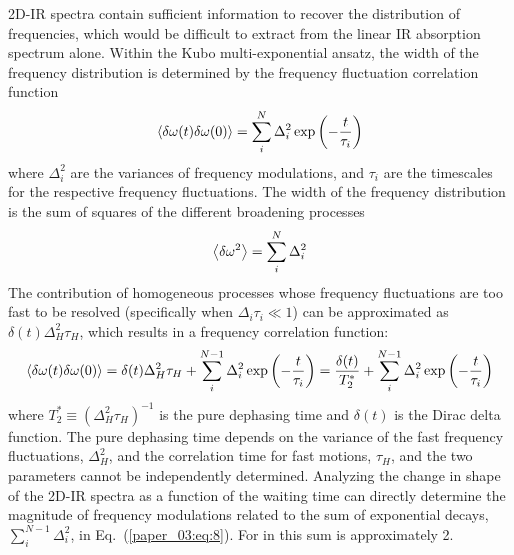 \documentclass[%
  class = book,%
  crop = false,%
  float = true,%
  multi = true,%
  preview = false,%
]{standalone}
\let\cite\autocite
\begin{document}
2D-IR spectra contain sufficient information to recover the distribution of frequencies, which would be difficult to extract from the linear IR absorption spectrum alone.\cite{Brinzer2015} Within the Kubo multi-exponential ansatz, the width of the frequency distribution is determined by the frequency fluctuation correlation function
\begin{equation}
  \label{paper_03:eq:6}
  \Braket{\delta\omega(t)\delta\omega(0)} = \sum_{i}^{N} \Delta_{i}^{2}\exp\left( - \frac{t}{\tau_{i}} \right)
\end{equation}
where \(\Delta_{i}^{2}\) are the variances of frequency modulations, and \(\tau_{i}\) are the timescales for the respective frequency fluctuations. The width of the frequency distribution is the sum of squares of the different broadening processes
\begin{equation}
  \label{paper_03:eq:7}
  \Braket{\delta\omega^{2}} = \sum_{i}^{N} \Delta_{i}^{2}
\end{equation}
The contribution of homogeneous processes whose frequency fluctuations are too fast to be resolved (specifically when \(\Delta_{i}\tau_{i} \ll 1\)) can be approximated as \(\delta(t)\Delta_{H}^{2}\tau_{H}\), which results in a frequency correlation function:
\begin{equation}
  \label{paper_03:eq:8}
  \Braket{\delta\omega(t)\delta\omega(0)} = \delta(t)\Delta_{H}^{2}\tau_{H} + \sum_{i}^{N - 1}{\Delta_{i}^{2}\exp\left( - \frac{t}{\tau_{i}} \right)} = \frac{\delta(t)}{T_{2}^{*}} + \sum_{i}^{N - 1}{\Delta_{i}^{2}\exp\left( - \frac{t}{\tau_{i}} \right)}
\end{equation}
where \(T_{2}^{*} \equiv \left( \Delta_{H}^{2}\tau_{H} \right)^{- 1}\) is the pure dephasing time and \(\delta(t)\) is the Dirac delta function. The pure dephasing time depends on the variance of the fast frequency fluctuations, \(\Delta_{H}^{2}\), and the correlation time for fast motions, \(\tau_{H}\), and the two parameters cannot be independently determined. Analyzing the change in shape of the 2D-IR spectra as a function of the waiting time can directly determine the magnitude of frequency modulations related to the sum of exponential decays, \(\sum_{i}^{N - 1}\Delta_{i}^{2}\), in Eq.~(\ref{paper_03:eq:8}). For  in \ce{[C4C1im][PF6]} this sum is approximately \SI{2}{\wavenumber}.\cite{Brinzer2015}
\end{document}
